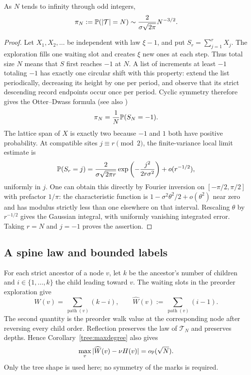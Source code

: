 \begin{lemma}
\label{tree:conditioning}
As $N$ tends to infinity through odd integers,
\begin{equation}
 \pi_N:=\P(|\mathcal T|=N)
 \sim\frac{2}{\sigma\sqrt{2\pi}}N^{-3/2}.
 \label{tree:size-probability}
\end{equation}
\end{lemma}
\begin{proof}
Let $X_1,X_2,\ldots$ be independent with law $\xi-1$, and put
$S_r=\sum_{j=1}^rX_j$.  The exploration fills one waiting slot and
creates $\xi$ new ones at each step.  Thus total size $N$ means that
$S$ first reaches $-1$ at $N$.  A list of increments at least $-1$
totaling $-1$ has exactly one circular shift with this property: extend
the list periodically, decreasing its height by one per period, and
observe that its strict descending record endpoints occur once per
period.  Cyclic symmetry therefore gives the Otter--Dwass formula
(see also \cite[Theorem~15.5]{Janson2012})
\[
 \pi_N=\frac1N\P(S_N=-1).
\]
The lattice span of $X$ is exactly two because $-1$ and $1$ both have
positive probability.  At compatible sites $j\equiv r\pmod2$, the
finite-variance local limit estimate is
\[
 \P(S_r=j)=\frac{2}{\sigma\sqrt{2\pi r}}
             \exp\left(-\frac{j^2}{2r\sigma^2}\right)
             +o(r^{-1/2}),
\]
uniformly in $j$.  One can obtain this directly by Fourier inversion on
$[-\pi/2,\pi/2]$ with prefactor $1/\pi$: the characteristic function is
$1-\sigma^2\theta^2/2+o(\theta^2)$ near zero and has modulus strictly
less than one elsewhere on that interval.  Rescaling $\theta$ by
$r^{-1/2}$ gives the Gaussian integral, with uniformly vanishing
integrated error.  Taking $r=N$ and $j=-1$ proves the assertion.
\end{proof}

\subsection{A spine law and bounded labels}

For each strict ancestor of a node $v$, let $k$ be the ancestor's number
of children and $i\in\{1,\ldots,k\}$ the child leading toward $v$.
The waiting slots in the preorder exploration give
\begin{equation}
 W(v)=\sum_{\operatorname{path}(v)}(k-i),
 \qquad
 \widehat W(v):=\sum_{\operatorname{path}(v)}(i-1).
 \label{tree:waiting-slots}
\end{equation}
The second quantity is the preorder walk value at the corresponding
node after reversing every child order.  Reflection preserves the law
of $\mathcal T_N$ and preserves depths.  Hence
Corollary~\ref{tree:maxdegree} also gives
\begin{equation}
 \max_v|\widehat W(v)-\nu H(v)|=o_{\P}(\sqrt N).
 \label{tree:mirror-estimate}
\end{equation}
Only the tree shape is used here; no symmetry of the marks is required.

